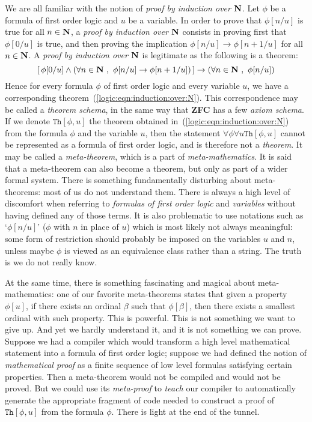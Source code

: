 We are all familiar with the notion of {\em proof by induction over
$\mbox{$\bf N$}$}. Let $\phi$ be a formula of first order logic and $u$ be a
variable. In order to prove that $\phi[n/u]$ is true for all
$n\in\mbox{$\bf N$}$, a {\em proof by induction over $\mbox{$\bf N$}$} consists in proving
first that $\phi[0/u]$ is true, and then proving the implication
$\phi[n/u]\to\phi[n+1/u]$ for all $n\in\mbox{$\bf N$}$. A {\em proof by
induction over $\mbox{$\bf N$}$} is legitimate as the following is a theorem:
    \begin{equation}\label{logic:eqn:induction:over:N}
    [\,\phi[0/u]\land(\forall n\in\N\ ,\
    \phi[n/u]\to\phi[n+1/u])\,]\to(\forall n\in\N\ ,\ \phi[n/u])
    \end{equation}
Hence for every formula $\phi$ of first order logic and every
variable $u$, we have a corresponding
theorem~(\ref{logic:eqn:induction:over:N}). This correspondence may
be called a {\em theorem schema}, in the same way that {\bf ZFC} has
a few {\em axiom schema}. If we denote $\texttt{Th}[\phi,u]$ the
theorem obtained in~(\ref{logic:eqn:induction:over:N}) from the
formula $\phi$ and the variable $u$, then the statement
$\forall\phi\forall u\texttt{Th}[\phi,u]$ cannot be represented as a
formula of first order logic, and is therefore not a {\em theorem}.
It may be called a {\em meta-theorem}, which is a part of {\em
meta-mathematics}. It is said that a meta-theorem can also become a
theorem, but only as part of a wider formal system. There is
something fundamentally disturbing about meta-theorems: most of us
do not understand them. There is always a high level of discomfort
when referring to {\em formulas of first order logic} and {\em
variables} without having defined any of those terms. It is also
problematic to use notations such as `$\phi[n/u]$' ($\phi$ with $n$
in place of $u$) which is most likely not always meaningful: some
form of restriction should probably be imposed on the variables $u$
and $n$, unless maybe $\phi$ is viewed as an equivalence class
rather than a string. The truth is we do not really know.

At the same time, there is something fascinating and magical about
meta-mathematics: one of our favorite meta-theorems states that
given a property $\phi[u]$, if there exists an ordinal $\beta$ such
that $\phi[\beta]$, then there exists a smallest ordinal with such
property. This is powerful. This is not something we want to give
up. And yet we hardly understand it, and it is not something we can
prove. Suppose we had a compiler which would transform a high level
mathematical statement into a formula of first order logic; suppose
we had defined the notion of {\em mathematical proof} as a finite
sequence of low level formulas satisfying certain properties. Then a
meta-theorem would not be compiled and would not be proved. But we
could use its {\em meta-proof} to {\em teach} our compiler to
automatically generate the appropriate fragment of code needed to
construct a proof of $\texttt{Th}[\phi,u]$ from the formula $\phi$.
There is light at the end of the tunnel.


